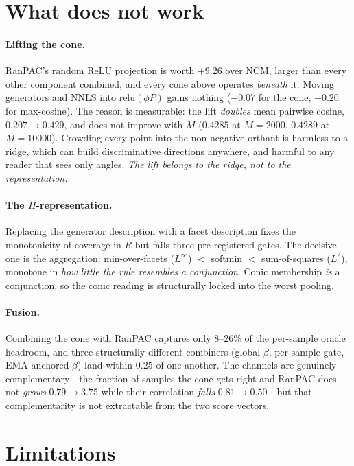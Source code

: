 \documentclass[10pt,twocolumn]{article}
\begin{document}
\section{What does not work}

\paragraph{Lifting the cone.} RanPAC's random ReLU projection is worth $+9.26$
over NCM, larger than every other component combined, and every cone above
operates \emph{beneath} it. Moving generators and NNLS into $\mathrm{relu}(\phi P)$
gains nothing ($-0.07$ for the cone, $+0.20$ for max-cosine). The reason is
measurable: the lift \emph{doubles} mean pairwise cosine, $0.207 \to 0.429$, and
does not improve with $M$ ($0.4285$ at $M{=}2000$, $0.4289$ at $M{=}10000$).
Crowding every point into the non-negative orthant is harmless to a ridge, which
can build discriminative directions anywhere, and harmful to any reader that sees
only angles. \emph{The lift belongs to the ridge, not to the representation.}

\paragraph{The $H$-representation.} Replacing the generator description with a
facet description fixes the monotonicity of coverage in $R$ but fails three
pre-registered gates. The decisive one is the aggregation: min-over-facets
($L^\infty$) $<$ softmin $<$ sum-of-squares ($L^2$), monotone in \emph{how little
the rule resembles a conjunction}. Conic membership \emph{is} a conjunction, so
the conic reading is structurally locked into the worst pooling.

\paragraph{Fusion.} Combining the cone with RanPAC captures only $8$--$26\%$ of
the per-sample oracle headroom, and three structurally different combiners
(global $\beta$, per-sample gate, EMA-anchored $\beta$) land within $0.25$ of one
another. The channels are genuinely complementary---the fraction of samples the
cone gets right and RanPAC does not \emph{grows} $0.79 \to 3.75$ while their
correlation \emph{falls} $0.81\to0.50$---but that complementarity is not
extractable from the two score vectors.

\section{Limitations}
\end{document}

